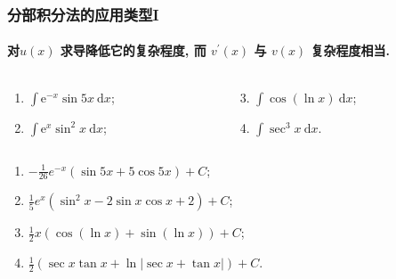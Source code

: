 \documentclass[
10pt,
aspectratio=43,
]{beamer}
\begin{document}
\begin{frame}
	\frametitle{分部积分法的应用类型I}
	\framesubtitle{对$u(x)$ 求导降低它的复杂程度, 而 $v^{\prime}(x)$ 与 $v(x)$ 复杂程度相当. }
	\everymath{\displaystyle}
	\begin{block}{}
		\begin{columns}[onlytextwidth]
			\begin{column}{0.5\textwidth}
				\begin{enumerate}
					\item $\int \mathrm{e}^{-x} \sin 5 x \mathrm{~d} x$;
					\item $\int \mathrm{e}^x \sin ^2 x \mathrm{~d} x$;
				\end{enumerate}
			\end{column}
			\begin{column}{0.5\textwidth}
				\begin{enumerate}
					\setcounter{enumi}{2}
					\item $\int \cos (\ln x) \mathrm{~d} x$;
					\item $\int \sec ^3 x \mathrm{~d} x$.
				\end{enumerate}
			\end{column}
		\end{columns}
	\end{block}
	\begin{exampleblock}{}
		\begin{enumerate}
			\pause \item $-\frac{1}{26}e^{-x}\left(\sin 5x +5\cos 5x\right)+C$;
			\pause \item $\frac{1}{5}e^{x}\left(\sin^2x -2\sin x\cos x+2\right)+C$;
			\pause \item $\frac12x\left(\cos(\ln x)+\sin(\ln x)\right)+C$;
			\pause \item $\frac{1}{2}(\sec x \tan x+\ln |\sec x+\tan x|)+C$.
		\end{enumerate}
	\end{exampleblock}
\end{frame}
\end{document}
